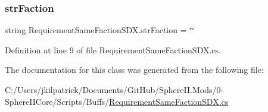 \subsubsection{\texorpdfstring{strFaction}{strFaction}}
{\footnotesize\ttfamily string Requirement\+Same\+Faction\+S\+D\+X.\+str\+Faction = \char`\"{}\char`\"{}}



Definition at line 9 of file Requirement\+Same\+Faction\+S\+D\+X.\+cs.



The documentation for this class was generated from the following file\+:\begin{DoxyCompactItemize}
\item 
C\+:/\+Users/jkilpatrick/\+Documents/\+Git\+Hub/\+Sphere\+I\+I.\+Mods/0-\/\+Sphere\+I\+I\+Core/\+Scripts/\+Buffs/\mbox{\hyperlink{_requirement_same_faction_s_d_x_8cs}{Requirement\+Same\+Faction\+S\+D\+X.\+cs}}\end{DoxyCompactItemize}
